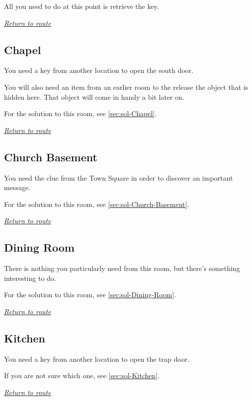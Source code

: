 \documentclass[a5paper]{extarticle}
\begin{document}
All you need to do at this point is retrieve the key.

\hyperref[sec:route-7]{\emph{Return to route}}

\newpage
\subsection{Chapel}\label{sec:req-Chapel}

You need a key from another location to open the south door.

You will also need an item from an earlier room to the release the object that is hidden here.
That object will come in handy a bit later on.

For the solution to this room, see \cref{sec:sol-Chapel}.

\hyperref[sec:route-7]{\emph{Return to route}}

\newpage
\subsection{Church Basement}\label{sec:req-Church-Basement}

You need the clue from the Town Square in order to discover an important message.

For the solution to this room, see \cref{sec:sol-Church-Basement}.

\hyperref[sec:route-7]{\emph{Return to route}}

\newpage
\subsection{Dining Room}\label{sec:req-Dining-Room}

There is nothing you particularly need from this room,
but there's something interesting to do.

For the solution to this room, see \cref{sec:sol-Dining-Room}.

\hyperref[sec:route-8]{\emph{Return to route}}

\newpage
\subsection{Kitchen}\label{sec:req-Kitchen}

You need a key from another location to open the trap door.

If you are not sure which one, see \cref{sec:sol-Kitchen}.

\hyperref[sec:route-8]{\emph{Return to route}}
\end{document}
